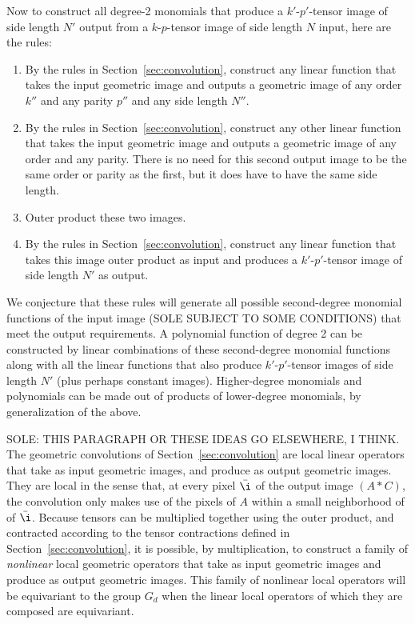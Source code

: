 \documentclass{article}
\theoremstyle{plain}
\newcommand{\sectionname}{Section}
\newcommand{\secref}[1]{\sectionname~\ref{#1}}
\begin{document}
Now to construct all degree-2 monomials that produce a $k'$-$p'$-tensor image of side length $N'$ output from a $k$-$p$-tensor image of side length $N$ input, here are the rules:
\begin{enumerate}
    \item By the rules in \secref{sec:convolution}, construct any linear function that takes the input geometric image and outputs a geometric image of any order $k''$ and any parity $p''$ and any side length $N''$.
    \item By the rules in \secref{sec:convolution}, construct any other linear function that takes the input geometric image and outputs a geometric image of any order and any parity.
    There is no need for this second output image to be the same order or parity as the first, but it does have to have the same side length.
    \item Outer product these two images.
    \item By the rules in \secref{sec:convolution}, construct any linear function that takes this image outer product as input and produces a $k'$-$p'$-tensor image of side length $N'$ as output.
\end{enumerate}

We conjecture that these rules will generate all possible second-degree monomial functions of the input image (SOLE SUBJECT TO SOME CONDITIONS) that meet the output requirements. A polynomial function of degree 2 can be constructed by linear combinations of these second-degree monomial functions along with all the linear functions that also produce $k'$-$p'$-tensor images of side length $N'$ (plus perhaps constant images).
Higher-degree monomials and polynomials can be made out of products of lower-degree monomials, by generalization of the above.

SOLE: THIS PARAGRAPH OR THESE IDEAS GO ELSEWHERE, I THINK.
The geometric convolutions of \secref{sec:convolution} are local linear operators that take as input geometric images, and produce as output geometric images.
They are local in the sense that, at every pixel $\bar\i$ of the output image $(A\ast C)$, the convolution only makes use of the pixels of $A$ within a small neighborhood of of $\bar\i$.
Because tensors can be multiplied together using the outer product, and contracted according to the tensor contractions defined in \secref{sec:convolution}, it is possible, by multiplication, to construct a family of \emph{nonlinear} local geometric operators that take as input geometric images and produce as output geometric images.
This family of nonlinear local operators will be equivariant to the group $G_d$ when the linear local operators of which they are composed are equivariant.
\end{document}
